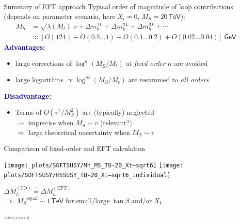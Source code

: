 \documentclass[hyperref={pdfpagelabels=false},ngerman]{beamer}
\newcommand{\cmark}{\ding{51}}%
\newcommand{\xmark}{\ding{55}}%
\newcommand{\eh}[1]{\,\mathsf{#1}}
\newcommand{\ok}{\textcolor{darkgreen}{\cmark}}
\newcommand{\notok}{\textcolor{red}{\xmark}}
\newcommand{\MS}{\ensuremath{M_S}}
\newcommand{\mycite}[1]{\ensuremath{\text{\textcolor{darkgray}{\tiny [#1]}}}}
\renewcommand{\emph}[1]{\textbf{\textcolor{darkblue}{#1}}}
\newcommand{\GeV}{\eh{GeV}}
\newcommand{\TeV}{\eh{TeV}}
\newcommand{\DMhFO}{\ensuremath{\Delta M_h^{(\text{FO})}}}
\newcommand{\DMhEFT}{\ensuremath{\Delta M_h^{(\text{EFT})}}}
\begin{document}
\begin{frame}{Summary of EFT approach}
  Typical order of magnitude of loop contributions (depends on
  parameter scenario, here $X_t = 0$, $\MS = 20\eh{TeV}$):
  \begin{align*}
    M_h &= \sqrt{\lambda(M_t)}\; v + \Delta m_h^{1L} + \Delta m_h^{2L} + \Delta m_h^{3L} + \cdots \\
    &\approx [O(124) + O(0.5\ldots 1) + O(0.1\ldots 0.2) + O(0.02\ldots 0.04)] \GeV
  \end{align*}
  \emph{Advantages:}
  \begin{itemize}
  \item[\ok] large corrections of $\log^n(\MS/M_t)$ at \textit{fixed order} $n$ are avoided
  \item[\ok] large logarithms $\propto\log^\infty(M_S/M_t)$ are resummed to \textit{all orders}
  \end{itemize}
  \emph{Disadvantage:}
  \begin{itemize}
  \item[\notok] Terms of $O(v^2/M_S^2)$ are (typically) neglected \\
    $\Rightarrow$ imprecise when $\MS \sim v$ (relevant?) \\
    $\Rightarrow$ large theoretical uncertainty when $\MS \sim v$
  \end{itemize}
\end{frame}

\begin{frame}{Comparison of fixed-order and EFT calculation}
  \begin{center}
    \texttt{[image: plots/SOFTSUSY/Mh\_MS\_TB-20\_Xt--sqrt6]}\hfill
    \texttt{[image: plots/SOFTSUSY/HSSUSY\_TB-20\_Xt--sqrt6\_individual]}
  \end{center}
  \begin{center}
    $\DMhFO \overset{!}{=} \DMhEFT$\\[0.5em]
    $\Rightarrow$ $\MS^{\text{equal}} \sim 1\TeV$ for
    small/large $\tan\beta$ and/or $X_t$
  \end{center}
  \mycite{1804.09410}
\end{frame}
\end{document}
